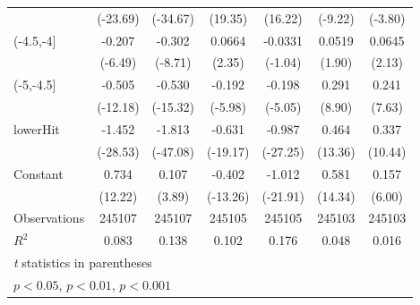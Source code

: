 {\begin{tabular}{l*{6}{c}}
                    &    (-23.69)         &    (-34.67)         &     (19.35)         &     (16.22)         &     (-9.22)         &     (-3.80)         \\
[1em]
(-4.5,-4]           &      -0.207\sym{***}&      -0.302\sym{***}&      0.0664\sym{*}  &     -0.0331         &      0.0519         &      0.0645\sym{*}  \\
                    &     (-6.49)         &     (-8.71)         &      (2.35)         &     (-1.04)         &      (1.90)         &      (2.13)         \\
[1em]
(-5,-4.5]           &      -0.505\sym{***}&      -0.530\sym{***}&      -0.192\sym{***}&      -0.198\sym{***}&       0.291\sym{***}&       0.241\sym{***}\\
                    &    (-12.18)         &    (-15.32)         &     (-5.98)         &     (-5.05)         &      (8.90)         &      (7.63)         \\
[1em]
lowerHit            &      -1.452\sym{***}&      -1.813\sym{***}&      -0.631\sym{***}&      -0.987\sym{***}&       0.464\sym{***}&       0.337\sym{***}\\
                    &    (-28.53)         &    (-47.08)         &    (-19.17)         &    (-27.25)         &     (13.36)         &     (10.44)         \\
[1em]
Constant            &       0.734\sym{***}&       0.107\sym{***}&      -0.402\sym{***}&      -1.012\sym{***}&       0.581\sym{***}&       0.157\sym{***}\\
                    &     (12.22)         &      (3.89)         &    (-13.26)         &    (-21.91)         &     (14.34)         &      (6.00)         \\
\hline
Observations        &      245107         &      245107         &      245105         &      245105         &      245103         &      245103         \\
\(R^{2}\)           &       0.083         &       0.138         &       0.102         &       0.176         &       0.048         &       0.016         \\
\hline\hline
\multicolumn{7}{l}{\footnotesize \textit{t} statistics in parentheses}\\
\multicolumn{7}{l}{\footnotesize \sym{*} \(p<0.05\), \sym{**} \(p<0.01\), \sym{***} \(p<0.001\)}\\
\end{tabular}
}
